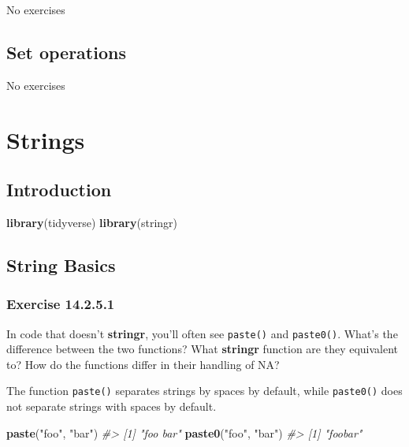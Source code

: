 \documentclass[]{book}
\newenvironment{Shaded}{\begin{snugshade}}{\end{snugshade}}
\newcommand{\CommentTok}[1]{\textcolor[rgb]{0.56,0.35,0.01}{\textit{#1}}}
\newcommand{\KeywordTok}[1]{\textcolor[rgb]{0.13,0.29,0.53}{\textbf{#1}}}
\newcommand{\NormalTok}[1]{#1}
\newcommand{\StringTok}[1]{\textcolor[rgb]{0.31,0.60,0.02}{#1}}
\theoremstyle{plain}
\theoremstyle{remark}
\begin{document}
No exercises

\hypertarget{set-operations}{%
\section{Set operations}\label{set-operations}}

No exercises

\hypertarget{strings}{%
\chapter{Strings}\label{strings}}

\hypertarget{introduction-9}{%
\section{Introduction}\label{introduction-9}}

\begin{Shaded}
\begin{Highlighting}[]
\KeywordTok{library}\NormalTok{(tidyverse)}
\KeywordTok{library}\NormalTok{(stringr)}
\end{Highlighting}
\end{Shaded}

\hypertarget{string-basics}{%
\section{String Basics}\label{string-basics}}

\hypertarget{exercise-14.2.5.1}{%
\subsection*{\texorpdfstring{Exercise {14.2.5.1}}{Exercise 14.2.5.1}}\label{exercise-14.2.5.1}}

In code that doesn't \textbf{stringr}, you'll often see \texttt{paste()} and \texttt{paste0()}. What's the difference between the two functions? What \textbf{stringr} function are they equivalent to? How do the functions differ in their handling of NA?

The function \texttt{paste()} separates strings by spaces by default, while \texttt{paste0()} does not separate strings with spaces by default.

\begin{Shaded}
\begin{Highlighting}[]
\KeywordTok{paste}\NormalTok{(}\StringTok{"foo"}\NormalTok{, }\StringTok{"bar"}\NormalTok{)}
\CommentTok{#> [1] "foo bar"}
\KeywordTok{paste0}\NormalTok{(}\StringTok{"foo"}\NormalTok{, }\StringTok{"bar"}\NormalTok{)}
\CommentTok{#> [1] "foobar"}
\end{Highlighting}
\end{Shaded}
\end{document}
